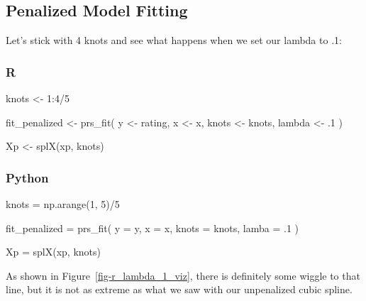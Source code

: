 \documentclass[
  letterpaper,
]{krantz}
\newenvironment{Shaded}{}{}
\newcommand{\DecValTok}[1]{\textcolor[rgb]{0.25,0.63,0.44}{#1}}
\newcommand{\FloatTok}[1]{\textcolor[rgb]{0.25,0.63,0.44}{#1}}
\newcommand{\FunctionTok}[1]{\textcolor[rgb]{0.02,0.16,0.49}{#1}}
\newcommand{\NormalTok}[1]{#1}
\newcommand{\OperatorTok}[1]{\textcolor[rgb]{0.40,0.40,0.40}{#1}}
\newcommand{\OtherTok}[1]{\textcolor[rgb]{0.00,0.44,0.13}{#1}}
\newcommand{\SpecialCharTok}[1]{\textcolor[rgb]{0.25,0.44,0.63}{#1}}
\begin{document}
\subsection{Penalized Model Fitting}\label{penalized-model-fitting}

Let's stick with 4 knots and see what happens when we set our lambda to
.1:

\subsubsection{R}

\begin{Shaded}
\begin{Highlighting}[]
\NormalTok{knots }\OtherTok{\textless{}{-}} \DecValTok{1}\SpecialCharTok{:}\DecValTok{4}\SpecialCharTok{/}\DecValTok{5}

\NormalTok{fit\_penalized }\OtherTok{\textless{}{-}} \FunctionTok{prs\_fit}\NormalTok{(}
\NormalTok{  y }\OtherTok{\textless{}{-}}\NormalTok{ rating,}
\NormalTok{  x }\OtherTok{\textless{}{-}}\NormalTok{ x,}
\NormalTok{  knots }\OtherTok{\textless{}{-}}\NormalTok{ knots,}
\NormalTok{  lambda }\OtherTok{\textless{}{-}}\NormalTok{ .}\DecValTok{1}
\NormalTok{) }

\NormalTok{Xp }\OtherTok{\textless{}{-}} \FunctionTok{splX}\NormalTok{(xp, knots) }
\end{Highlighting}
\end{Shaded}

\subsubsection{Python}

\begin{Shaded}
\begin{Highlighting}[]
\NormalTok{knots }\OperatorTok{=}\NormalTok{ np.arange(}\DecValTok{1}\NormalTok{, }\DecValTok{5}\NormalTok{)}\OperatorTok{/}\DecValTok{5}

\NormalTok{fit\_penalized }\OperatorTok{=}\NormalTok{ prs\_fit(}
\NormalTok{    y }\OperatorTok{=}\NormalTok{ y,}
\NormalTok{    x }\OperatorTok{=}\NormalTok{ x,}
\NormalTok{    knots }\OperatorTok{=}\NormalTok{ knots,}
\NormalTok{    lamba }\OperatorTok{=} \FloatTok{.1}
\NormalTok{)}

\NormalTok{Xp }\OperatorTok{=}\NormalTok{ splX(xp, knots)}
\end{Highlighting}
\end{Shaded}

As shown in Figure~\ref{fig-r_lambda_1_viz}, there is definitely some
wiggle to that line, but it is not as extreme as what we saw with our
unpenalized cubic spline.
\end{document}
